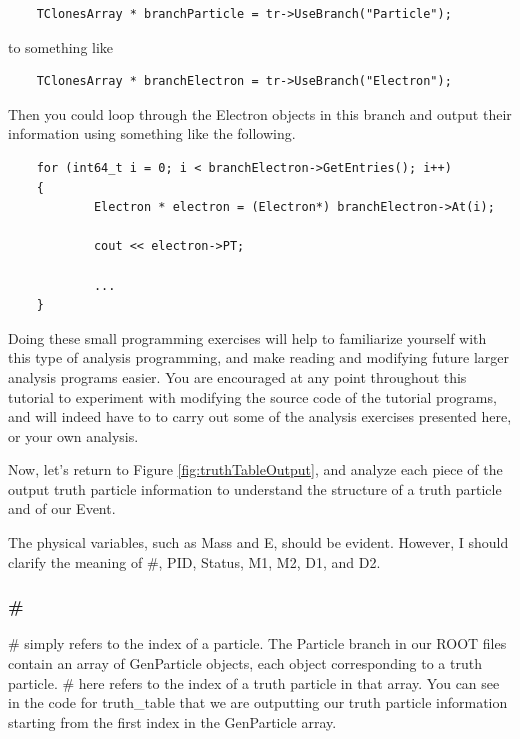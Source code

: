 \documentclass{article}
\begin{document}
\begin{verbatim}
	TClonesArray * branchParticle = tr->UseBranch("Particle");
\end{verbatim}

to something like

\begin{verbatim}
	TClonesArray * branchElectron = tr->UseBranch("Electron");
\end{verbatim}

Then you could loop through the Electron objects in this branch and output their information
using something like the following.

\begin{verbatim}
	for (int64_t i = 0; i < branchElectron->GetEntries(); i++)
	{
	        Electron * electron = (Electron*) branchElectron->At(i);

	        cout << electron->PT;

	        ...
	}
\end{verbatim}

Doing these small programming exercises will help to familiarize yourself with this type of
analysis programming, and make reading and modifying future larger analysis programs easier.
You are encouraged at any point throughout this tutorial to experiment with modifying the source
code of the tutorial programs, and will indeed have to to carry out some of the analysis exercises
presented here, or your own analysis.

\bigskip

Now, let's return to Figure \ref{fig:truthTableOutput}, and analyze each piece of the output truth
particle information to understand the structure of a truth particle and of our Event.

\bigskip

The physical variables, such as Mass and E, should be evident. However, I should clarify the
meaning of \#, PID, Status, M1, M2, D1, and D2.

\subsubsection{\#}

\# simply refers to the index of a particle. The Particle branch in our ROOT files contain an
array of GenParticle objects, each object corresponding to a truth particle. \# here refers to
the index of a truth particle in that array. You can see in the code for truth\_table that we
are outputting our truth particle information starting from the first index in the GenParticle array.
\end{document}
